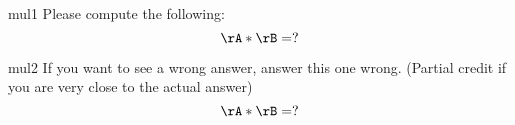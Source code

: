 % 
\pgfmathsetmacro\rAA{\rA * \rB}
\pgfmathsetmacro\rBB{\rA + \rB}
\pgfmathsetmacro\rCC{\rA - \rB}
\pgfmathsetmacro{}

\newcommand{\dispint}[1]{\ensuremath{\pgfmathprintnumber{ #1}}}



\begin{question}{mul1} 
  Please compute the following:
  \[ \rA * \rB = ? \]
  
  \begin{choices}
    \correctchoice{ \dispint{\rAA}}
    \wrongchoice{\dispint{\rBB} }
    \wrongchoice{\dispint{\rCC} }
    \wrongchoice{\dispint{\rDD} }
  \end{choices}
\end{question}

% 
\pgfmathsetmacro\rAA{\rA * \rB}
\pgfmathsetmacro\rBB{\rA + \rB}
\pgfmathsetmacro\rCC{\rA - \rB}
\pgfmathsetmacro{}



\begin{question}{mul2} 
  If you want to see a wrong answer, answer this one wrong. (Partial credit if you are very close to the actual answer)
  \[ \rA * \rB = ? \]
  
  \begin{choices}
    \correctchoice{\dispint{\rAA}}
    \wrongchoice{\dispint{\rBB} }
    \wrongchoice{\dispint{\rCC} }
    \wrongchoice{\dispint{\rDD} } 
  \end{choices}
\end{question}